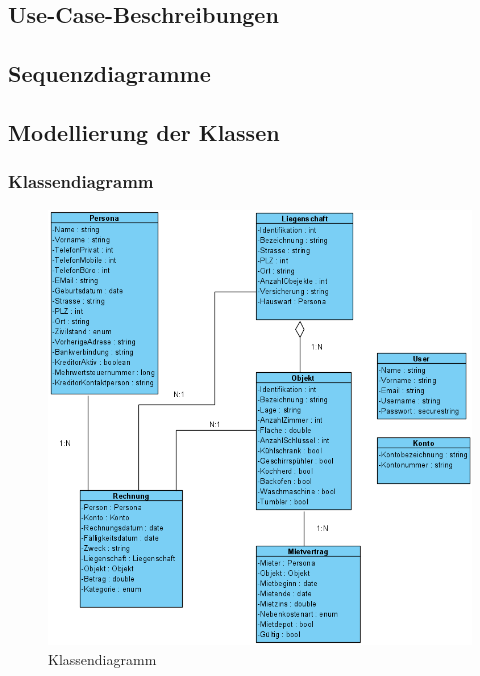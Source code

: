 \subsection{Use-Case-Beschreibungen}


\subsection{Sequenzdiagramme}

\newpage
\subsection{Modellierung der Klassen}
\subsubsection{Klassendiagramm}
\begin{figure}[htbt]
  \begin{center}
    \includegraphics[width=0.9\linewidth]{content/diagrams/out/classdiagram/classdiagram.png}
    \caption{Klassendiagramm}
    \label{classdiagramm}
  \end{center}
\end{figure}

